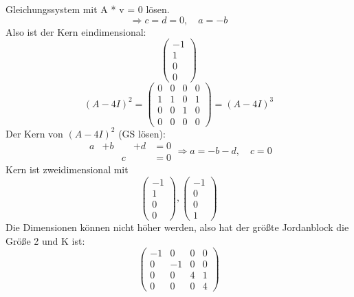 \documentclass{article} %
\begin{document}
Gleichungssystem mit A * v = 0 lösen. 
\[
\Rightarrow c = d = 0, \quad a = -b
\]
Also ist der Kern eindimensional: 
\[
\begin{pmatrix}
-1\\1\\0\\0
\end{pmatrix}
\]
\[
(A -4 I )^2 =
\begin{pmatrix}
0 & 0 & 0 & 0 \\
1 & 1 & 0 & 1 \\
0 & 0 & 1 & 0 \\
0 & 0 & 0 & 0
\end{pmatrix} = (A -4 I )^3 
\]
Der Kern von $(A -4 I )^2$ (GS lösen):
\[
\begin{array}{rrrrl}
     a&+b&&+d &=0\\
     &&c&&=0
\end{array} \Rightarrow a = -b-d, \quad c = 0
\]
Kern ist zweidimensional mit
\[
\begin{pmatrix}
-1\\1\\0\\0
\end{pmatrix}, \begin{pmatrix}
-1\\0\\0\\1
\end{pmatrix}
\]
Die Dimensionen können nicht höher werden, also hat der größte Jordanblock die Größe 2 und K ist: 
\[
\begin{pmatrix}
-1&0&0&0\\
0&-1&0&0\\
0&0&4&1\\
0&0&0&4
\end{pmatrix}
\]
\end{document}
